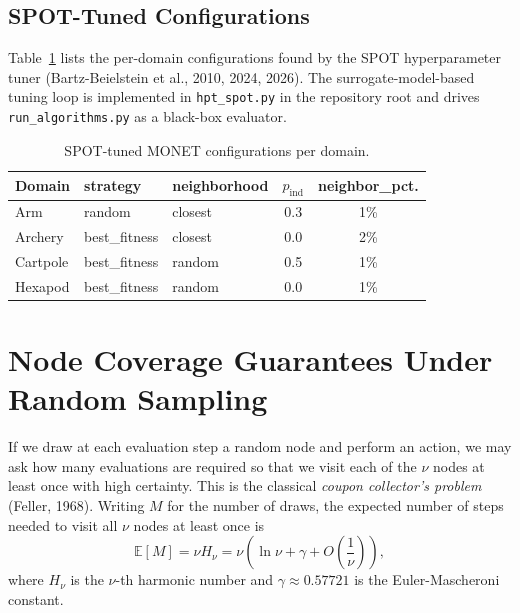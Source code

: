 \documentclass[11pt,a4paper]{article}
\begin{document}
\subsection{SPOT-Tuned Configurations}

Table~\ref{tab:spot-configs} lists the per-domain configurations found
by the SPOT hyperparameter tuner (Bartz-Beielstein et al., 2010, 2024,
2026). The surrogate-model-based tuning loop is implemented in
\texttt{hpt\_spot.py} in the repository root and drives
\texttt{run\_algorithms.py} as a black-box evaluator.

\begin{table}[H]
\centering
\caption{SPOT-tuned MONET configurations per domain.}
\label{tab:spot-configs}
\small
\begin{tabular}{@{}lllcc@{}}
\toprule
\textbf{Domain} & \textbf{strategy} & \textbf{neighborhood}
    & $p_\text{ind}$ & \textbf{neighbor\_pct.} \\
\midrule
Arm      & random        & closest  & 0.3 & 1\% \\
Archery  & best\_fitness & closest  & 0.0 & 2\% \\
Cartpole & best\_fitness & random   & 0.5 & 1\% \\
Hexapod  & best\_fitness & random   & 0.0 & 1\% \\
\bottomrule
\end{tabular}
\end{table}

\section{Node Coverage Guarantees Under Random Sampling}
\label{sec:coupon}

If we draw at each evaluation step a random node and perform an
action, we may ask how many evaluations are required so that we
visit each of the $\nu$ nodes at least once with high certainty.
This is the classical \emph{coupon collector's problem}
(Feller, 1968). Writing $M$ for the number of draws, the expected
number of steps needed to visit all $\nu$ nodes at least once is
\[
\mathbb{E}[M] = \nu H_\nu
             = \nu \left( \ln \nu + \gamma
                   + O\!\left(\frac{1}{\nu}\right) \right),
\]
where $H_\nu$ is the $\nu$-th harmonic number and
$\gamma \approx 0.57721$ is the Euler-Mascheroni constant.
\end{document}
